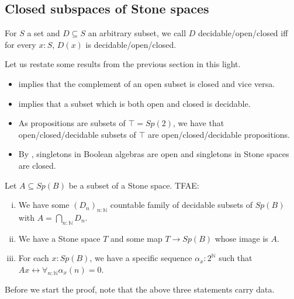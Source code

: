 \documentclass{../util/zariski-small}
\begin{document}
\subsection{Closed subspaces of Stone spaces}
%
\begin{definition}
  For $S$ a set and $D\subseteq S$ an arbitrary subset, we call $D$ decidable/open/closed 
  iff for every $x:S$, $D(x)$ is decidable/open/closed. 
\end{definition}
\begin{remark}
  Let us restate some results from the previous section in this light. 
  \begin{itemize}
    \item   {} implies that the complement of an 
  open subset is closed and vice versa. 
  \item 
     implies that a subset which is both open 
    and closed is decidable. 
  \item 
    As propositions are subsets of $\top = Sp(2)$, 
    we have that open/closed/decidable subsets of $\top$
    are open/closed/decidable propositions. 
  \item By , singletons in 
    Boolean algebras are open and singletons in Stone spaces are closed. 
\end{itemize}
\end{remark}
\begin{theorem}
  Let $A\subseteq Sp(B)$ be a subset of a Stone space. TFAE:
  \begin{enumerate}[(i)]
    \item We have some $(D_n)_{n:\mathbb N}$ countable family 
      of decidable subsets of $Sp(B)$ with $A = \bigcap_{n:\mathbb N} D_n$. 
    \item We have a Stone space $T$ and some map $T\to Sp(B)$ 
      whose image is $A$. 
    \item For each $x:Sp(B)$, we have a specific sequence $\alpha_x:2^\mathbb N$ such that 
      $A x \leftrightarrow \forall_{n:\mathbb N} \alpha_x(n) = 0$. 
  \end{enumerate}
\end{theorem}
Before we start the proof, note that the above three statements carry data.
\end{document}
